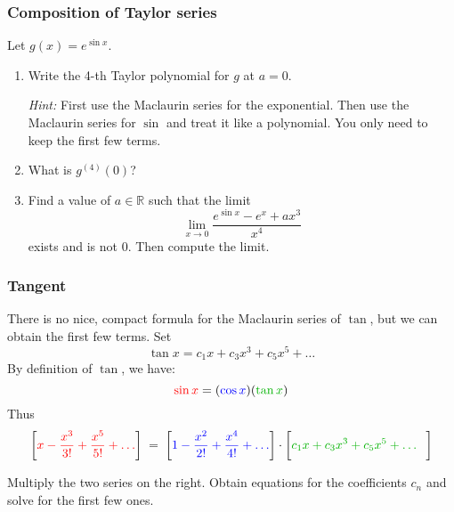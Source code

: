 \documentclass[14pt]{beamer}
\begin{document}
	\begin{frame}[t]
		\fontsize{13}{13}\selectfont
		\frametitle{Composition of Taylor series}

		Let $\displaystyle g(x) = e^{\sin x}$.
		\vspace{.2cm}

		\begin{enumerate}
			\item Write the 4-th Taylor polynomial for $g$ at $a=0$.
				\vspace{.2cm}

				{\fontsize{11}{11}\selectfont \emph{Hint:} First use the Maclaurin series for the exponential. Then use the Maclaurin series for $\sin$ and treat it like a polynomial. You only need to keep the first few terms. }
				\vspace{.2cm}


			\item What is $\displaystyle g^{(4)}(0)$?
				\vspace{.2cm}


			\item Find a value of $a \in \mathbb{R}$ such that the limit
				\[
					\lim_{x \to 0}\frac{e^{\sin x}- e^{x}+ ax^{3}}{x^{4}}
				\]
				exists and is not 0. Then compute the limit.
		\end{enumerate}
	\end{frame}

	\begin{frame}[t]
		\fontsize{13}{13}\selectfont
		\frametitle{Tangent}

		There is no nice, compact formula for the Maclaurin series of $\tan$, but we
		can obtain the first few terms. Set
		\[
			\tan x = c_{1}x + c_{3}x^{3}+ c_{5}x^{5}+ \ldots
		\]
		By definition of $\tan$, we have:
		\[
			{\color{red} \sin x}= ({\color{blue} \cos x}) ({\color{verde} \tan x})
		\]
		Thus
		{\fontsize{11}{11}\selectfont \[\left[{\color{red} x - \frac{x^{3}}{3!} + \frac{x^{5}}{5!} + \ldots}\right] \; = \; \left[{\color{blue} 1 - \frac{x^{2}}{2!} + \frac{x^{4}}{4!} + \ldots}\right] \cdot \left[{\color{verde} c_1 x + c_3 x^3 + c_5 x^5 + \ldots}\phantom{\frac{1}{1}}\right]\] }

		Multiply the two series on the right. Obtain equations for the coefficients
		$c_{n}$ and solve for the first few ones.
	\end{frame}
\end{document}

